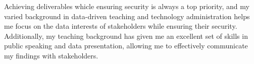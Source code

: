 


Achieving deliverables whicle ensuring security is always a top priority, and my varied background in data-driven teaching and technology administration helps me focus on the data interests of stakeholders while ensuring their security. Additionally, my teaching background has given me an excellent set of skills in public speaking and data presentation, allowing me to effectively communicate my findings with stakeholders.